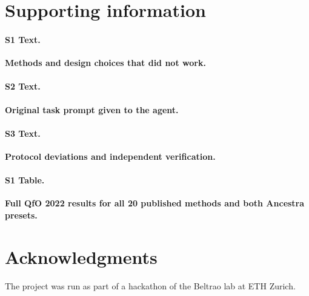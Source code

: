 \documentclass[10pt,letterpaper]{article}
\begin{document}
\section*{Supporting information}

\paragraph*{S1 Text.}
\label{S1_Text}
{\bf Methods and design choices that did not work.}

\paragraph*{S2 Text.}
\label{S2_Text}
{\bf Original task prompt given to the agent.}

\paragraph*{S3 Text.}
\label{S3_Text}
{\bf Protocol deviations and independent verification.}

\paragraph*{S1 Table.}
\label{S1_Table}
{\bf Full QfO 2022 results for all 20 published methods and both Ancestra presets.}

\section*{Acknowledgments}
The project was run as part of a hackathon of the Beltrao lab at ETH Zurich.

\nolinenumbers


\end{document}
